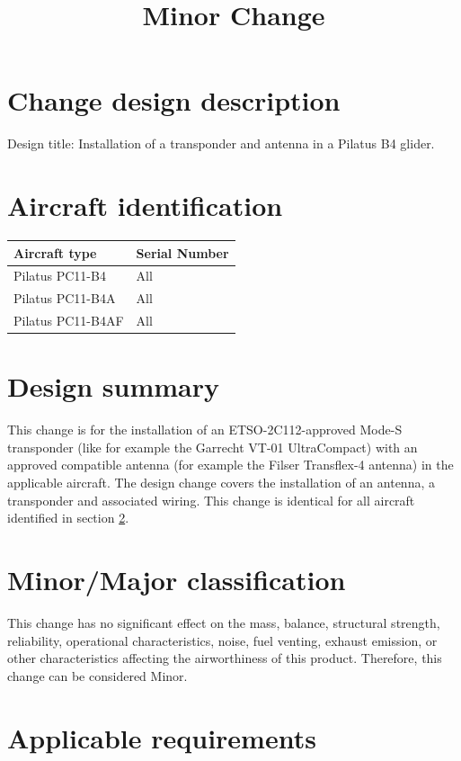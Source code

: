 \documentclass{article}
\begin{document}
\title{Minor Change}
\author{}
\date{}
\maketitle

\section{Change design description}
Design title: Installation of a transponder and antenna in a Pilatus B4 glider.

\section{Aircraft identification}
\label{section:identification}
\begin{tabular}{|l|l|}
\hline
Aircraft type & Serial Number \\
\hline
Pilatus PC11-B4 & All \\
Pilatus PC11-B4A & All \\
Pilatus PC11-B4AF & All \\
\hline
\end{tabular}

\section{Design summary}
This change is for the installation of an ETSO-2C112-approved Mode-S transponder (like for example the Garrecht VT-01 UltraCompact) with an approved compatible antenna (for example the Filser Transflex-4 antenna) in the applicable aircraft. The design change covers the installation of an antenna, a transponder and associated wiring. This change is identical for all aircraft identified in section \ref{section:identification}.

\section{Minor/Major classification}
This change has no significant effect on the mass, balance, structural strength, reliability, operational characteristics, noise, fuel venting, exhaust emission, or other characteristics affecting the airworthiness of this product. Therefore, this change can be considered Minor.

\section{Applicable requirements}
\end{document}
